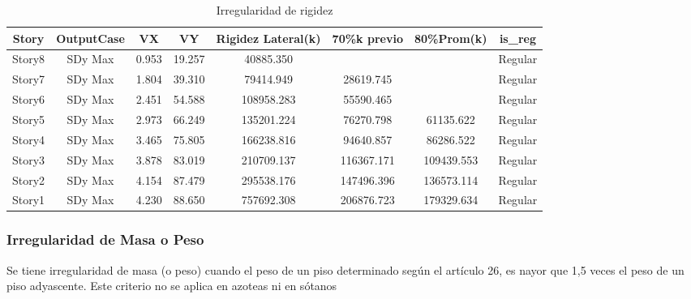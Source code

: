 \documentclass{article}%
\begin{document}
%


\begin{table}[h!]%
\centering%
\caption{Irregularidad de rigidez}%
\begin{tabular}{cccccccc}
\toprule
Story & OutputCase & VX & VY & Rigidez Lateral(k) & 70\%k previo & 80\%Prom(k) & is\_reg \\
\midrule
Story8 & SDy Max & 0.953 & 19.257 & 40885.350 &  &  & Regular \\
Story7 & SDy Max & 1.804 & 39.310 & 79414.949 & 28619.745 &  & Regular \\
Story6 & SDy Max & 2.451 & 54.588 & 108958.283 & 55590.465 &  & Regular \\
Story5 & SDy Max & 2.973 & 66.249 & 135201.224 & 76270.798 & 61135.622 & Regular \\
Story4 & SDy Max & 3.465 & 75.805 & 166238.816 & 94640.857 & 86286.522 & Regular \\
Story3 & SDy Max & 3.878 & 83.019 & 210709.137 & 116367.171 & 109439.553 & Regular \\
Story2 & SDy Max & 4.154 & 87.479 & 295538.176 & 147496.396 & 136573.114 & Regular \\
Story1 & SDy Max & 4.230 & 88.650 & 757692.308 & 206876.723 & 179329.634 & Regular \\
\bottomrule
\end{tabular}
%
\end{table}

%
\subsubsection{Irregularidad de Masa o Peso}%
\label{ssubsec:IrregularidaddeMasaoPeso}%
\begin{tcolorbox}[colback=gray!5!white,colframe=cyan!75!black,fonttitle=\bfseries,title=Tabla N°9 E-030]%
Se tiene irregularidad de masa (o peso) cuando el peso de un piso determinado según el artículo 26, es nayor que 1,5 veces el peso de un piso adyascente. Este criterio no se aplica en azoteas ni en sótanos%
\end{tcolorbox}%
\end{document}
